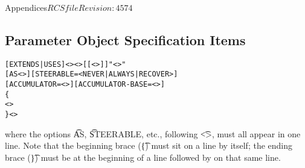 \begin{cactuspart}{Appendices}{$RCSfile$}{$Revision: 4574 $}
\subsection{Parameter Object Specification Items}
\label{subsec:Appendix.param.specification_items}

\begin{alltt}
[EXTENDS|USES] <> <>[[<>]] "<>" 
[AS <>] [STEERABLE=<NEVER|ALWAYS|RECOVER>] 
[ACCUMULATOR=<>] [ACCUMULATOR-BASE=<>]
\{
  <>
\} <>
\end{alltt}
where the options {\t AS}, {\t STEERABLE}, etc., following {\t <>},
must all appear in one line.
  Note that the beginning brace ({\t\{}) must
sit on a line by itself; the ending brace ({\t\}}) must be at the
beginning of a line followed by  on that same line.


\end{cactuspart}
